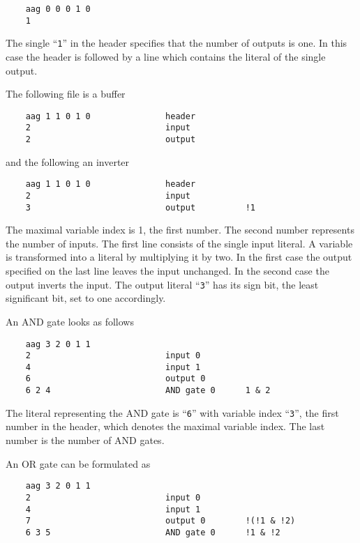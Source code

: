 \documentclass{llncs}
\begin{document}
\begin{verbatim}
    aag 0 0 0 1 0
    1
\end{verbatim}

  The single ``\texttt{1}'' in the header specifies that the number of outputs is one.
  In this case the header is followed by a line which contains the literal
  of the single output.

  The following file is a buffer

\begin{verbatim}
    aag 1 1 0 1 0               header
    2                           input
    2                           output
\end{verbatim}

  and the following an inverter

\begin{verbatim}
    aag 1 1 0 1 0               header
    2                           input
    3                           output          !1
\end{verbatim}

  The maximal variable index is 1, the first number.  The second number
  represents the number of inputs.  The first line consists of the single
  input literal.  A variable is transformed into a literal by multiplying
  it by two.  In the first case the output specified on the last line leaves
  the input unchanged.  In the second case the output inverts the input.  The
  output literal ``\texttt{3}'' has its sign bit, the least significant bit, set to one
  accordingly.
  
  An AND gate looks as follows

\begin{verbatim}
    aag 3 2 0 1 1
    2                           input 0
    4                           input 1
    6                           output 0
    6 2 4                       AND gate 0      1 & 2
\end{verbatim}

  The literal representing the AND gate is ``\texttt{6}'' with variable index
  ``\texttt{3}'',
  the first number in the header, which denotes the maximal variable index.
  The last number is the number of AND gates.

  An OR gate can be formulated as

\begin{verbatim}
    aag 3 2 0 1 1
    2                           input 0
    4                           input 1
    7                           output 0        !(!1 & !2)
    6 3 5                       AND gate 0      !1 & !2
\end{verbatim}
\end{document}
